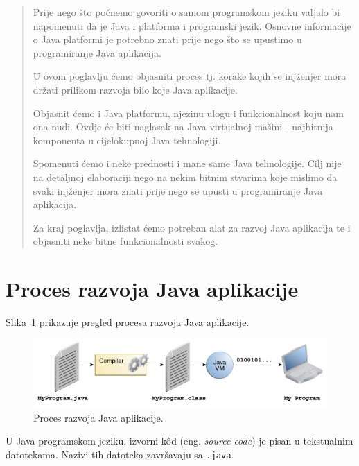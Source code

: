 \label{chap:java_technology}

\begin{abstract}
    Prije nego što počnemo govoriti o samom programskom jeziku valjalo bi napomenuti da je Java i platforma i programski jezik. Osnovne informacije o Java platformi je potrebno znati prije nego što se upustimo u programiranje Java aplikacija.
    
    U ovom poglavlju ćemo objasniti proces tj. korake kojih se injženjer mora držati prilikom razvoja bilo koje Java aplikacije.
    
    Objasnit ćemo i Java platformu, njezinu ulogu i funkcionalnost koju nam ona nudi. Ovdje će biti naglasak na Java virtualnoj mašini - najbitnija komponenta u cijelokupnoj Java tehnologiji.
    
    Spomenuti ćemo i neke prednosti i mane same Java tehnologije. Cilj nije na detaljnoj elaboraciji nego na nekim bitnim stvarima koje mislimo da svaki injženjer mora znati prije nego se upusti u programiranje Java aplikacija.
    
    Za kraj poglavlja, izlistat ćemo potreban alat za razvoj Java aplikacija te i objasniti neke bitne funkcionalnosti svakog.
\end{abstract}

\section{Proces razvoja Java aplikacije}
Slika~\ref{fig:software_development_process} prikazuje pregled procesa razvoja Java aplikacije.~\cite{javatutorials}

\begin{figure}[!htbp]
    \caption{Proces razvoja Java aplikacije.}
    \label{fig:software_development_process}
    \centering
    \includegraphics[width=\textwidth]{images/software_development_process}
\end{figure}

U Java programskom jeziku, izvorni kôd (eng. \emph{source code}) je pisan u tekstualnim datotekama. Nazivi tih datoteka završavaju sa \texttt{.java}.

